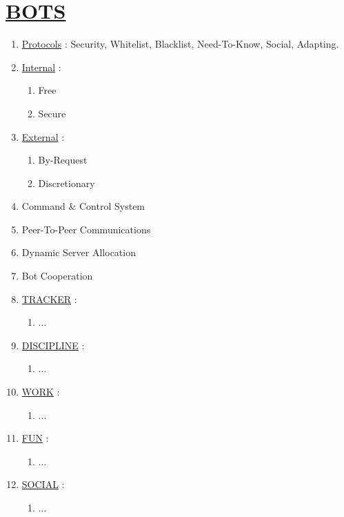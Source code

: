 \documentclass[11pt]{article}
\begin{document}
\section*{\ul{BOTS}}
\begin{enumerate}
	\item[] \ul{Protocols} : Security, Whitelist, Blacklist, Need-To-Know, Social, Adapting.

	\item[] \ul{Internal}  :
	\begin{enumerate}
		\item[] Free
		\item[] Secure
	\end{enumerate}
	
	\item[] \ul{External} :
	\begin{enumerate}
		\item[] By-Request
		\item[] Discretionary
	\end{enumerate}

	\item[] Command \& Control System
	\item[] Peer-To-Peer Communications
	\item[] Dynamic Server Allocation
	\item[] Bot Cooperation

	\item[] \ul{TRACKER} :
	\begin{enumerate}
		\item[] ...
	\end{enumerate}

	\item[] \ul{DISCIPLINE} :
	\begin{enumerate}
		\item[] ...
	\end{enumerate}

	\item[] \ul{WORK} :
	\begin{enumerate}
		\item[] ...
	\end{enumerate}

	\item[] \ul{FUN} :
	\begin{enumerate}
		\item[] ...
	\end{enumerate}

	\item[] \ul{SOCIAL} :
	\begin{enumerate}
		\item[] ...
	\end{enumerate}


\end{enumerate}
\end{document}
